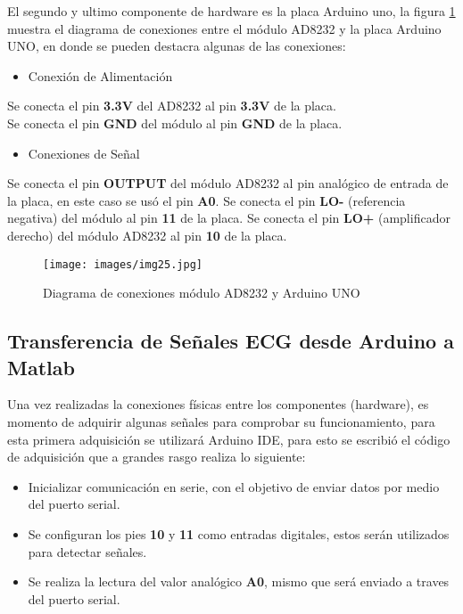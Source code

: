 El segundo y ultimo componente de hardware es la placa Arduino uno, la figura \ref{fig:Conexión} muestra el diagrama de conexiones entre el módulo AD8232 y la placa Arduino UNO, en donde se pueden destacra algunas de las conexiones:\\

\begin{itemize}
    \item Conexión de Alimentación\\
\end{itemize}
Se conecta el pin \textbf{3.3V} del AD8232 al pin \textbf{3.3V} de la placa.\\
Se conecta el pin \textbf{GND} del módulo al pin \textbf{GND} de la placa.

\begin{itemize}
    \item Conexiones de Señal
\end{itemize}

Se conecta el pin \textbf{OUTPUT} del módulo AD8232 al pin analógico de entrada de la placa, en este caso se usó el pin \textbf{A0}.
Se conecta el pin \textbf{LO-} (referencia negativa) del módulo al pin \textbf{11} de la placa.
Se conecta el pin \textbf{LO+} (amplificador derecho) del módulo AD8232 al pin \textbf{10} de la placa.

\begin{figure}[!ht]
    \centering
    \texttt{[image: images/img25.jpg]}
    \caption{Diagrama de conexiones módulo AD8232 y Arduino UNO}
    \label{fig:Conexión}
\end{figure}

\subsection[]{Transferencia de Señales ECG desde Arduino a Matlab}
Una vez realizadas la conexiones físicas entre los componentes (hardware), es momento de adquirir algunas señales para comprobar su funcionamiento, para esta primera adquisición se utilizará Arduino IDE, para esto se escribió el código de adquisición que a grandes rasgo realiza lo siguiente:

\begin{itemize}
    \item Inicializar comunicación en serie, con el objetivo de enviar datos por medio del puerto serial.
    \item Se configuran los pies \textbf{10} y \textbf{11} como entradas digitales, estos serán utilizados para detectar señales.
    \item Se realiza la lectura del valor analógico \textbf{A0}, mismo que será enviado a traves del puerto serial.
\end{itemize}

